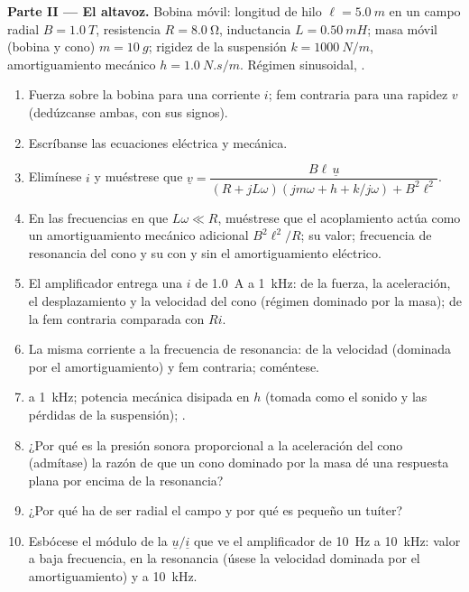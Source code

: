 \begin{problem}
\medskip
\noindent\textbf{Parte II --- El altavoz.}
Bobina móvil: longitud de hilo $\ell = \qty{5.0}{m}$ en un campo radial $B =
\qty{1.0}{T}$, resistencia $R = \qty{8.0}{\ohm}$, inductancia $L = \qty{0.50}{mH}$;
masa móvil (bobina y cono) $m = \qty{10}{g}$; rigidez de la suspensión
$k = \qty{1000}{N/m}$, amortiguamiento mecánico $h = \qty{1.0}{N.s/m}$.
Régimen sinusoidal, .
\begin{enumerate}[resume]
  \item Fuerza sobre la bobina para una corriente $i$; fem contraria para
        una rapidez $v$ (dedúzcanse ambas, con sus signos).
  \item Escríbanse las ecuaciones eléctrica y mecánica.
  \item Elimínese $i$ y muéstrese que
        $\underline v = \dfrac{B\ell\,\underline u}{(R + jL\omega)(jm\omega + h + k/j\omega) + B^2\ell^2}$.
  \item En las frecuencias en que $L\omega \ll R$, muéstrese que el
        acoplamiento actúa como un amortiguamiento mecánico adicional
        $B^2\ell^2/R$; su valor; frecuencia de resonancia del cono y su
         con y sin el amortiguamiento eléctrico.
  \item El amplificador entrega una $i$ de  \qty{1.0}{A} a \qty{1}{kHz}:
         de la fuerza, la aceleración, el desplazamiento y la
        velocidad del cono (régimen dominado por la masa);  de la
        fem contraria comparada con $Ri$.
  \item La misma corriente a la frecuencia de resonancia:  de la
        velocidad (dominada por el amortiguamiento) y fem contraria;
        coméntese.
  \item {} a \qty{1}{kHz}; potencia mecánica disipada en
        $h$ (tomada como el sonido y las pérdidas de la suspensión);
        .
  \item ¿Por qué es la presión sonora proporcional a la aceleración del
        cono (admítase) la razón de que un cono dominado por la masa dé una
        respuesta plana por encima de la resonancia?
  \item ¿Por qué ha de ser radial el campo y por qué es pequeño un tuíter?
  \item Esbócese el módulo de la  $\underline u/\underline i$ que ve
        el amplificador de \qty{10}{Hz} a \qty{10}{kHz}: valor a baja
        frecuencia, en la resonancia (úsese la velocidad dominada por el
        amortiguamiento) y a \qty{10}{kHz}.
\end{enumerate}


\end{problem}
